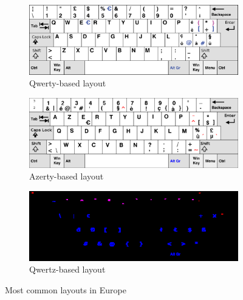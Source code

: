 \documentclass[12pt]{report}%
\begin{document}
\begin{figure}[H]
    \centering
    \begin{subfigure}[b]{0.3\textwidth}
        \includegraphics[width=\textwidth]{images/qwerty.png}
        \caption{Qwerty-based layout}
    \end{subfigure}
	 \begin{subfigure}[b]{0.3\textwidth}
        \includegraphics[width=\textwidth]{images/azerty.png}
        \caption{Azerty-based layout}
    \end{subfigure} 
    \begin{subfigure}[b]{0.3\textwidth}
        \includegraphics[width=\textwidth]{images/qwertz.png}
        \caption{Qwertz-based layout}
    \end{subfigure}
    \caption{Most common layouts in Europe}
\end{figure}
\clearpage
\end{document}
